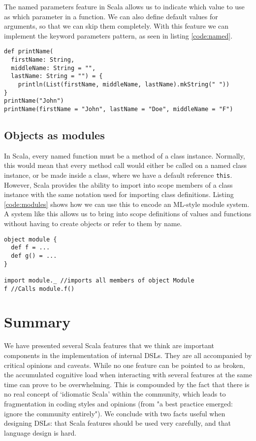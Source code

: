 The named parameters feature in Scala allows us to indicate which value to use as which parameter in a function.
We can also define default values for arguments, so that we can skip them completely.
With this feature we can implement the keyword parameters pattern, as seen in listing \ref{code:named}.

\begin{lstlisting}[caption=Named parameters and default arguments, label=code:named]
def printName(
  firstName: String,
  middleName: String = "",
  lastName: String = "") = {
    println(List(firstName, middleName, lastName).mkString(" "))
}
printName("John")
printName(firstName = "John", lastName = "Doe", middleName = "F")
\end{lstlisting}

\subsection{Objects as modules}

In Scala, every named function must be a method of a class instance.
Normally, this would mean that every method call would either be called on a named class instance, or be made inside a class, where we have a default reference \texttt{this}.
However, Scala provides the ability to import into scope members of a class instance with the same notation used for importing class definitions.
Listing \ref{code:modules} shows how we can use this to encode an ML-style module system.
A system like this allows us to bring into scope definitions of values and functions without having to create objects or refer to them by name.

\begin{lstlisting}[caption=Modules, label=code:modules, float]
object module {
  def f = ...
  def g() = ...
}

import module._ //imports all members of object Module
f //Calls module.f()
\end{lstlisting}

\section{Summary}

We have presented several Scala features that we think are important components in the implementation of internal DSLs.
They are all accompanied by critical opinions and caveats.
While no one feature can be pointed to as broken, the accumulated cognitive load when interacting with several features at the same time can prove to be overwhelming.
This is compounded by the fact that there is no real concept of `idiomatic Scala' within the community, which leads to fragmentation in coding styles and opinions (from \cite{Hale:2011} "a best practice emerged: ignore the community entirely").
We conclude with two facts useful when designing DSLs: that Scala features should be used very carefully, and that language design is hard.
